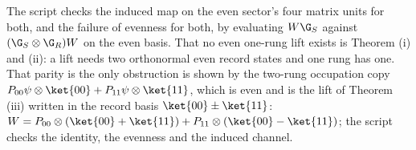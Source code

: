 The script checks the induced map on the even sector's four matrix units for both, and the failure of evenness for both, by evaluating $W\G_{S}$ against $(\G_{S}\otimes\G_{R})W$ on the even basis. That no even one-rung lift exists is Theorem (i) and (ii): a lift needs two orthonormal even record states and one rung has one. That parity is the only obstruction is shown by the two-rung occupation copy $P_{00}\psi \otimes \ket{00} + P_{11}\psi \otimes \ket{11}$, which is even and is the lift of Theorem (iii) written in the record basis $\ket{00} \pm \ket{11}$: $W = P_{00} \otimes (\ket{00} + \ket{11}) + P_{11} \otimes (\ket{00} - \ket{11})$; the script checks the identity, the evenness and the induced channel.
